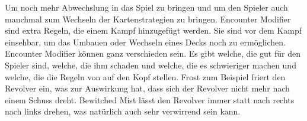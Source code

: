 Um noch mehr Abwechslung in das Spiel zu bringen und um den Spieler auch manchmal zum Wechseln der Kartenstrategien zu bringen.
Encounter Modifier sind extra Regeln, die einem Kampf hinzugefügt werden.
Sie sind vor dem Kampf einsehbar, um das Umbauen oder Wechseln eines Decks noch zu ermöglichen.
Encounter Modifier können ganz verschieden sein.
Es gibt welche, die gut für den Spieler sind, welche, die ihm schaden und welche, die es schwieriger machen und welche, die die Regeln von \FF auf den Kopf stellen.
Frost zum Beispiel friert den Revolver ein, was zur Auswirkung hat, dass sich der Revolver nicht mehr nach einem Schuss dreht.
Bewitched Mist lässt den Revolver immer statt nach rechts nach links drehen, was natürlich auch sehr verwirrend sein kann.



\renewcommand{\kapitelautor}{}
